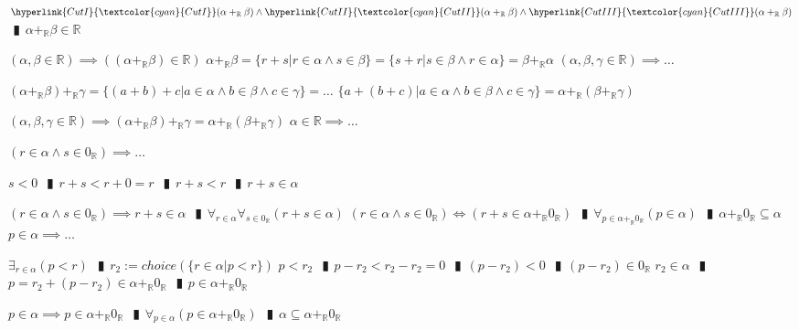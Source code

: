 \documentclass{book}
\newcommand{\rf}[1]{\hyperlink{#1}{\textcolor{cyan}{#1}}}
\newcommand{\abr}{:=}
\newcommand{\pipe}{$\phantom{(}\vrectangleblack\phantom{)}$}
\newcommand{\pr}[1]{\left(#1\right)}
\begin{document}
\begin{enumerate}
\begin{enumerate}
    \lit $\rf{CutI}(\alpha +_{\mathbb{R}} \beta) \land \rf{CutII}(\alpha +_{\mathbb{R}} \beta) \land \rf{CutIII}(\alpha +_{\mathbb{R}} \beta)$ \pipe $\alpha +_{\mathbb{R}} \beta \in \mathbb{R}$
  \end{enumerate}
  \lit $(\alpha, \beta \in \mathbb{R}) \implies \pr{(\alpha +_{\mathbb{R}} \beta) \in \mathbb{R}}$
  \lit $\alpha +_{\mathbb{R}} \beta = \{r + s | r \in \alpha \land s \in \beta\} = \{s + r | s \in \beta \land r \in \alpha\} = \beta +_{\mathbb{R}} \alpha$
  \lit $(\alpha, \beta, \gamma \in \mathbb{R}) \implies \ldots$
  \begin{enumerate}
    \lit $(\alpha +_{\mathbb{R}} \beta) +_{\mathbb{R}} \gamma = \{(a + b) + c | a \in \alpha \land b \in \beta \land c \in \gamma\} = \ldots$
    \lit $\{a + (b + c) | a \in \alpha \land b \in \beta \land c \in \gamma\} = \alpha +_{\mathbb{R}} (\beta +_{\mathbb{R}} \gamma)$
  \end{enumerate}
  \lit $(\alpha, \beta, \gamma \in \mathbb{R}) \implies (\alpha +_{\mathbb{R}} \beta) +_{\mathbb{R}} \gamma = \alpha +_{\mathbb{R}} (\beta +_{\mathbb{R}} \gamma)$
  \lit $\alpha \in \mathbb{R} \implies \ldots$
  \begin{enumerate}
    \lit $(r \in \alpha \land s \in 0_{\mathbb{R}}) \implies \ldots$
    \begin{enumerate}
      \lit $s < 0$ \pipe $r + s < r + 0 = r$ \pipe $r + s < r$ \pipe $r + s \in \alpha$
    \end{enumerate}
    \lit $(r \in \alpha \land s \in 0_{\mathbb{R}}) \implies r + s \in \alpha$ \pipe $\forall_{r \in \alpha} \forall_{s \in 0_{\mathbb{R}}}(r + s \in \alpha)$
    \lit $(r \in \alpha \land s \in 0_{\mathbb{R}}) \iff (r + s \in \alpha +_{\mathbb{R}} 0_{\mathbb{R}})$ \pipe $\forall_{p \in \alpha +_{\mathbb{R}} 0_{\mathbb{R}}}(p \in \alpha)$ \pipe $\alpha +_{\mathbb{R}} 0_{\mathbb{R}} \subseteq \alpha$
    \lit $p \in \alpha \implies \ldots$
    \begin{enumerate}
      \lit $\exists_{r \in \alpha}(p < r)$ \pipe $r_2 \abr choice(\{r \in \alpha | p < r\})$
      \lit $p < r_2$ \pipe $p - r_2 < r_2 - r_2 = 0$ \pipe $(p - r_2 )< 0$ \pipe $(p - r_2) \in 0_{\mathbb{R}}$
      \lit $r_2 \in \alpha$ \pipe $p = r_2 + (p - r_2) \in \alpha +_{\mathbb{R}} 0_{\mathbb{R}}$ \pipe $p \in \alpha +_{\mathbb{R}} 0_{\mathbb{R}}$
    \end{enumerate}
    \lit $p \in \alpha \implies p \in \alpha +_{\mathbb{R}} 0_{\mathbb{R}}$ \pipe $\forall_{p \in \alpha}(p \in \alpha +_{\mathbb{R}} 0_{\mathbb{R}})$ \pipe $\alpha \subseteq \alpha +_{\mathbb{R}} 0_{\mathbb{R}}$

\end{enumerate}
\end{enumerate}
\end{document}
